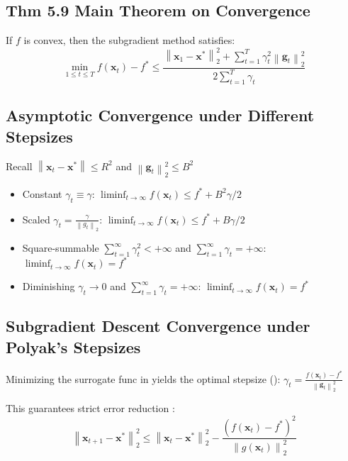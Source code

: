\subsection*{Thm 5.9 Main Theorem on Convergence}
If $f$ is convex, then the subgradient method satisfies:
$$
\min _{1 \leq t \leq T} f\left(\mathbf{x}_{t}\right)-f^{*} \leq \frac{\left\|\mathbf{x}_{1}-\mathbf{x}^{*}\right\|_{2}^{2}+\sum_{t=1}^{T} \gamma_{t}^{2}\left\|\mathbf{g}_{t}\right\|_{2}^{2}}{2 \sum_{t=1}^{T} \gamma_{t}}
$$






\subsection*{Asymptotic Convergence under Different Stepsizes}
Recall $\left\|\mathbf{x}_{t}-\mathbf{x}^{*}\right\| \leq R^2$ and $\left\|\mathbf{g}_{t}\right\|_{2}^{2} \leq B^2$
\begin{itemize}[leftmargin=*]
    \item Constant $\gamma_{t} \equiv \gamma$: 
$
    \displaystyle \liminf _{t \rightarrow \infty} f\left(\mathbf{x}_{t}\right) \leq f^{*}+B^{2} \gamma / 2 
$
    \item Scaled $\gamma_{t}=\frac{\gamma}{\left\|{g}_{t}\right\|_{2}}$:
$
 \displaystyle\liminf _{t \rightarrow \infty} f\left(\mathbf{x}_{t}\right) \leq f^{*}+B \gamma / 2 
$
    \item Square-summable  $\sum_{t=1}^{\infty} \gamma_{t}^{2}<+\infty$ and $\sum_{t=1}^{\infty} \gamma_{t}=+\infty$:
$
\liminf _{t \rightarrow \infty} f\left(\mathbf{x}_{t}\right)=f^{*} 
$
    \item Diminishing $\gamma_{t} \rightarrow 0$ and $\sum_{t=1}^{\infty} \gamma_{t}=+\infty$:
$
\liminf _{t \rightarrow \infty} f\left(\mathbf{x}_{t}\right)=f^{*}
$
\end{itemize}






\subsection*{Subgradient Descent Convergence under Polyak's Stepsizes}
Minimizing the surrogate func in  yields the optimal stepsize ():
$
\gamma_{t}=\frac{f\left(\mathbf{x}_{t}\right)-f^{*}}{\left\|\mathbf{g}_{t}\right\|_{2}^{2}}
$



This guarantees strict error reduction \red{(*)}:
$$
\left\|\mathbf{x}_{t+1}-\mathbf{x}^{*}\right\|_{2}^{2} \leq\left\|\mathbf{x}_{t}-\mathbf{x}^{*}\right\|_{2}^{2}-\frac{\left(f\left(\mathbf{x}_{t}\right)-f^{*}\right)^{2}}{\left\|g\left(\mathbf{x}_{t}\right)\right\|_{2}^{2}}
$$ 

